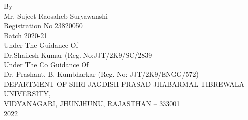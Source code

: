 \begin{titlepage}
\begin{center}
{By\\
Mr. Sujeet Raosaheb Suryawanshi\\
Registration No 23820050\\

Batch 2020-21\\
\vspace{0.2cm}
Under The Guidance Of\\
\vspace{0.2cm}
Dr.Shailesh Kumar (Reg. No:JJT/2K9/SC/2839 \\
\vspace{0.2cm}
Under The Co Guidance Of\\
\vspace{0.2cm}
Dr. Prashant. B. Kumbharkar (Reg. No: JJT/2K9/ENGG/572)\\
\vspace{0.2cm}
{\color{red}
DEPARTMENT OF SHRI JAGDISH PRASAD JHABARMAL TIBREWALA UNIVERSITY,\\
VIDYANAGARI, JHUNJHUNU, RAJASTHAN – 333001\\
2022
}}
\end{center}
\end{titlepage}

